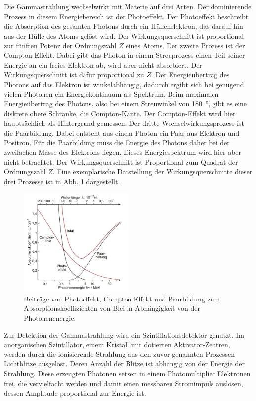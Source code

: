 Die Gammastrahlung wechselwirkt mit Materie auf drei Arten. Der dominierende Prozess in diesem Energiebereich ist der Photoeffekt.
Der Photoeffekt beschreibt die Absorption des gesamten Photons durch ein Hüllenelektron, das darauf hin aus der Hülle des Atoms gelöst wird. Der Wirkungsquerschnitt ist proportional zur fünften Potenz der Ordnungszahl $Z$ eines Atoms.
Der zweite Prozess ist der Compton-Effekt. 
Dabei gibt das Photon in einem Streuprozess einen Teil seiner Energie an ein freies Elektron ab, wird aber nicht absorbiert. Der Wirkungsquerschnitt ist dafür proportional zu $Z$. 
Der Energieübertrag des Photons auf das Elektron ist winkelabhängig, dadurch ergibt sich bei genügend vielen Photonen ein Energiekontinuum als Spektrum. Beim maximalen Energieübertrag des Photons, also bei einem Streuwinkel von \SI{180}{\degree}, gibt es eine diskrete obere Schranke, die Compton-Kante.  
Der Compton-Effekt wird hier hauptsächlich als Hintergrund gemessen. Der dritte Wechselwirkungsprozess ist die Paarbildung. Dabei entsteht aus einem Photon ein Paar aus Elektron und Positron. Für die Paarbildung muss die Energie des Photons daher bei der zweifachen Masse des Elektrons liegen. Dieses Energiespektrum wird hier aber nicht betrachtet. Der Wirkungsquerschnitt ist Proportional zum Quadrat der Ordnungszahl $Z$. 
Eine exemplarische Darstellung der Wirkungsquerschnitte dieser drei Prozesse ist in Abb. \ref{abb:wirkungsquerschnitt} dargestellt.
\begin{figure}
    \centering
    \includegraphics[width=0.5\textwidth]{figures/strahlung.jpg}
    \caption{Beiträge von Photoeffekt, Compton-Effekt und Paarbildung zum Absorptionskoeffizienten von Blei in Abhängigkeit von der Photonenenergie. \cite{strahlung}}
    \label{abb:wirkungsquerschnitt}
    \end{figure}
Zur Detektion der Gammastrahlung wird ein Szintillationsdetektor genutzt. Im anorganischen Szintillator, einem Kristall mit dotierten Aktivator-Zentren, werden durch die ionisierende Strahlung aus den zuvor genannten Prozessen Lichtblitze ausgelöst. Deren Anzahl der Blitze ist abhängig von der Energie der Strahlung. Diese erzeugten Photonen setzen in einem Photomultiplier Elektronen frei, die vervielfacht werden und damit einen messbaren Stromimpuls auslösen, dessen Amplitude proportional zur Energie ist. 
